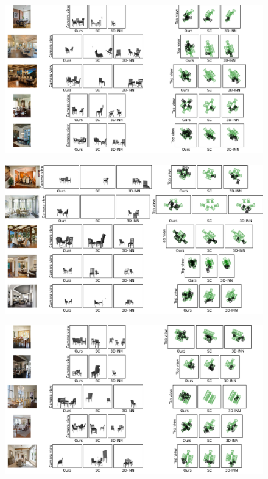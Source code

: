 \begin{figure}
    \includegraphics[width=\textwidth]{figures/qualitative_results/full/qual_results_15.pdf}
\end{figure}
\begin{figure}
    \includegraphics[width=\textwidth]{figures/qualitative_results/full/qual_results_16.pdf}
\end{figure}
\begin{figure}
    \includegraphics[width=\textwidth]{figures/qualitative_results/full/qual_results_17.pdf}
\end{figure}
